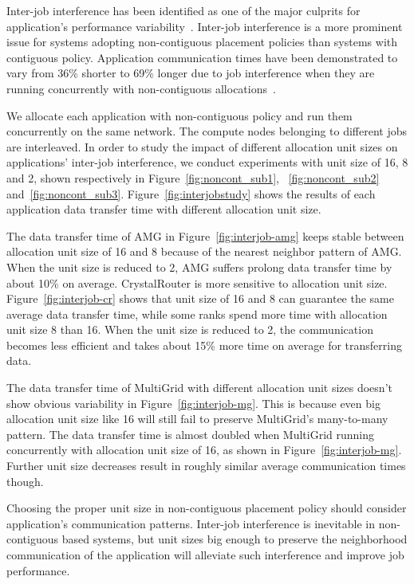 Inter-job interference has been identified as one of the major culprits 
for application's performance variability~\cite{abhinav-sc13,skinner}. 
Inter-job interference is a more prominent issue for systems adopting 
non-contiguous placement policies than systems with contiguous policy. 
Application communication times have been demonstrated to 
vary from 36\% shorter to 69\% longer due to job interference 
when they are running concurrently with non-contiguous allocations~\cite{abhinav-sc13}.

We allocate each application with non-contiguous policy and 
run them concurrently on the same network. 
The compute nodes belonging to different jobs are interleaved. 
In order to study the impact of different allocation unit sizes on 
applications' inter-job interference, 
we conduct experiments with unit size of 16, 8 and 2, 
shown respectively in Figure~\ref{fig:noncont_sub1}, 
~\ref{fig:noncont_sub2} and~\ref{fig:noncont_sub3}. 
Figure~\ref{fig:interjobstudy} shows the results of each application 
data transfer time with different allocation unit size. 

The data transfer time of AMG in Figure~\ref{fig:interjob-amg} keeps stable 
between allocation unit size of 16 and 8 because of the 
nearest neighbor pattern of AMG. 
When the unit size is reduced to 2, AMG suffers prolong data transfer time by about 10\% on average. 
CrystalRouter is more sensitive to allocation unit size. 
Figure~\ref{fig:interjob-cr} shows that unit size of 16 and 8 can guarantee 
the same average data transfer time, 
while some ranks spend more time with allocation unit size 8 than 16. 
When the unit size is reduced to 2, the communication becomes less efficient 
and takes about 15\% more time on average for transferring data. 

The data transfer time of MultiGrid with different allocation unit sizes 
doesn't show obvious variability in Figure~\ref{fig:interjob-mg}. 
This is because even big allocation unit size like 16 will still fail to preserve MultiGrid's many-to-many pattern. 
The data transfer time is almost doubled when MultiGrid running concurrently with allocation unit size of 16, 
as shown in Figure~\ref{fig:interjob-mg}. 
Further unit size decreases result in roughly similar average communication times though.

Choosing the proper unit size in non-contiguous placement policy should 
consider application's communication patterns. 
Inter-job interference is inevitable in non-contiguous based systems, 
but unit sizes big enough to preserve the neighborhood communication of the application 
will alleviate such interference and improve job performance. 



